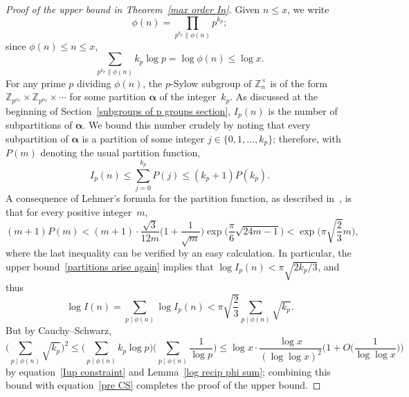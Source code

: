 \documentclass[12pt,reqno]{amsart}
\theoremstyle{definition}
\newcommand{\Z}{{\mathbb Z}}
\newcommand{\Znt}{{\Z_n^\times}}
\newcommand{\balpha}{{\bm\alpha}}
\begin{document}
\begin{proof}[Proof of the upper bound in Theorem~\ref{max order In}]
Given $n \leq x$, we write
\[
\phi(n) = \prod_{p^{k_p} \parallel \phi(n)} p^{k_p};
\]
since $\phi(n) \le n \leq x$,
\begin{equation}  \label{Iup constraint}
\sum_{p^{k_p} \parallel \phi(n)} k_p \log p = \log\phi(n) \le \log x.
\end{equation}
For any prime $p$ dividing $\phi(n)$, the $p$-Sylow subgroup of $\Znt$ is of the form $\Z_{p^{\alpha_1}} \times \Z_{p^{\alpha_2}} \times \cdots$ for some partition $\balpha$ of the integer~$k_p$. As discussed at the beginning of Section~\ref{subgroups of p groups section}, $I_p(n)$ is the number of subpartitions of $\balpha$. We bound this number crudely by noting that every subpartition of $\balpha$ is a partition of some integer $j \in \{0,1,\dots,k_p\}$; therefore, with $P(m)$ denoting the usual partition function,
\begin{equation}  \label{partitions arise again}
I_p(n) \leq \sum_{j = 0}^{k_p} P(j) \leq (k_p + 1) P(k_p).
\end{equation}
A consequence of Lehmer's formula for the partition function, as described in~\cite[proof of Theorem 2.1]{BO}, is that for every positive integer~$m$,
\[
(m+1)P(m) < (m+1)\cdot \frac{\sqrt3}{12m} \bigg( 1+\frac1{\sqrt m} \bigg) \exp\bigg( \frac\pi6\sqrt{24m-1} \bigg) < \exp\bigg( \pi\sqrt{\frac23} m \bigg),
\]
where the last inequality can be verified by an easy calculation. In particular, the upper bound~\eqref{partitions arise again} implies that $\log I_p(n) < \pi\sqrt{2k_p/3}$, and thus
\begin{equation}  \label{pre CS}
\log I(n) = \sum_{p \mid \phi(n)} \log I_p(n) < \pi\sqrt{\frac23} \sum_{p \mid \phi(n)} \sqrt{k_p}.
\end{equation}
But by Cauchy--Schwarz,
\[
\bigg( \sum_{p \mid \phi(n)} \sqrt{k_p} \bigg)^2 \le \bigg( \sum_{p \mid \phi(n)} k_p \log p \bigg) \bigg( \sum_{p \mid \phi(n)} \frac{1}{\log p} \bigg) \le \log x \cdot \frac{\log x}{(\log\log x)^2} \bigg( 1 + O\bigg( \frac1{\log\log x} \bigg) \bigg)
\]
by equation~\eqref{Iup constraint} and Lemma~\ref{log recip phi sum}; combining this bound with equation~\eqref{pre CS} completes the proof of the upper bound.
\end{proof}
\end{document}
